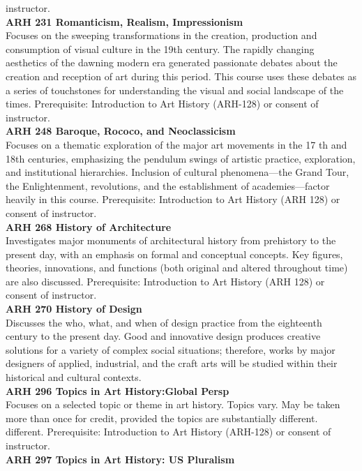 \documentclass[
  letterpaper,
]{scrbook}
\begin{document}
instructor.\\
\textbf{ARH 231 Romanticism, Realism, Impressionism}\\
Focuses on the sweeping transformations in the creation, production and
consumption of visual culture in the 19th century. The rapidly changing
aesthetics of the dawning modern era generated passionate debates about
the creation and reception of art during this period. This course uses
these debates as a series of touchstones for understanding the visual
and social landscape of the times. Prerequisite: Introduction to Art
History (ARH-128) or consent of instructor.\\
\textbf{ARH 248 Baroque, Rococo, and Neoclassicism}\\
Focuses on a thematic exploration of the major art movements in the 17
th and 18th centuries, emphasizing the pendulum swings of artistic
practice, exploration, and institutional hierarchies. Inclusion of
cultural phenomena---the Grand Tour, the Enlightenment, revolutions, and
the establishment of academies---factor heavily in this course.
Prerequisite: Introduction to Art History (ARH 128) or consent of
instructor.\\
\textbf{ARH 268 History of Architecture}\\
Investigates major monuments of architectural history from prehistory to
the present day, with an emphasis on formal and conceptual concepts. Key
figures, theories, innovations, and functions (both original and altered
throughout time) are also discussed. Prerequisite: Introduction to Art
History (ARH 128) or consent of instructor.\\
\textbf{ARH 270 History of Design}\\
Discusses the who, what, and when of design practice from the eighteenth
century to the present day. Good and innovative design produces creative
solutions for a variety of complex social situations; therefore, works
by major designers of applied, industrial, and the craft arts will be
studied within their historical and cultural contexts.\\
\textbf{ARH 296 Topics in Art History:Global Persp}\\
Focuses on a selected topic or theme in art history. Topics vary. May be
taken more than once for credit, provided the topics are substantially
different. different. Prerequisite: Introduction to Art History
(ARH-128) or consent of instructor.\\
\textbf{ARH 297 Topics in Art History: US Pluralism}\\
\end{document}
